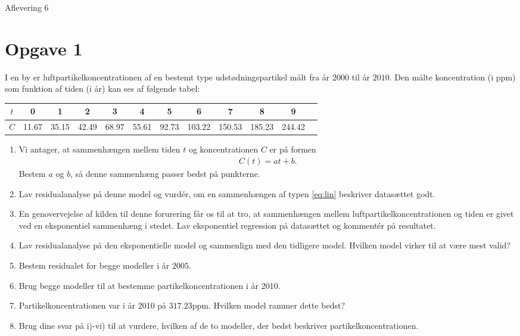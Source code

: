 \documentclass[12pt]{article}
\begin{document}



\begin{center}
\Huge
Aflevering 6
\end{center}
\section*{Opgave 1}

I en by er luftpartikelkoncentrationen af en bestemt type udstødningspartikel målt fra år $2000$ til år $2010$. Den målte koncentration (i ppm) som funktion af tiden (i år) kan ses af følgende tabel:
\begin{center}
\begin{tabular}{c|c|c|c|c|c|c|c|c|c|c|c}
$t$  & 0 & 1 & 2 & 3 & 4 & 5 & 6 & 7 & 8 & 9  \\
\hline
$C$  &11.67 & 35.15 & 42.49 & 68.97 & 55.61 & 92.73 & 103.22 & 150.53 & 185.23 & 244.42
\end{tabular}
\end{center}

\begin{enumerate}[label=\roman*)]
\item Vi antager, at sammenhængen mellem tiden $t$ og koncentrationen $C$ er på formen
\begin{align}\label{eq:lin}
C(t) = at+b.
\end{align}
Bestem $a$ og $b$, så denne sammenhæng passer bedst på punkterne. 
\item Lav residualanalyse på denne model og vurdér, om en sammenhængen af typen \eqref{eq:lin} beskriver datasættet godt.
\item En genovervejelse af kilden til denne forurering får os til at tro, at sammenhængen mellem luftpartikelkoncentrationen og tiden er givet ved en eksponentiel sammenhæng i stedet. Lav eksponentiel regression på datasættet og kommentér på resultatet.
\item Lav residualanalyse på den eksponentielle model og sammenlign med den tidligere model. Hvilken model virker til at være mest valid?
\item Bestem residualet for begge modeller i år $2005$.
\item Brug begge modeller til at bestemme partikelkoncentrationen i år 2010.
\item Partikelkoncentrationen var i år 2010 på $317.23$ppm. Hvilken model rammer dette bedst?
\item Brug dine svar på i)-vi) til at vurdere, hvilken af de to modeller, der bedst beskriver partikelkoncentrationen. 
\end{enumerate}
\end{document}
